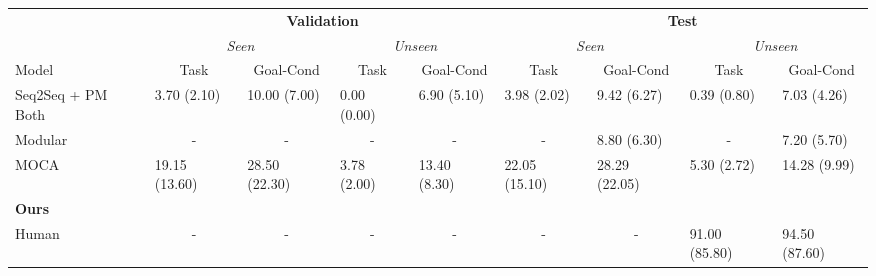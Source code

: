 \documentclass[11pt,a4paper]{article}
\begin{document}
\begin{table}[]
\centering
\resizebox{\textwidth}{!}
{\begin{tabular}{@{}lllllllll@{}}
\toprule
                         & \multicolumn{4}{c}{\textbf{Validation}}                                                                             & \multicolumn{4}{c}{\textbf{Test}}                                                                                   \\
                         & \multicolumn{2}{c}{\textit{Seen}}                        & \multicolumn{2}{c}{\textit{Unseen}}                      & \multicolumn{2}{c}{\textit{Seen}}                        & \multicolumn{2}{c}{\textit{Unseen}}                      \\
Model                    & \multicolumn{1}{c}{Task} & \multicolumn{1}{c}{Goal-Cond} & \multicolumn{1}{c}{Task} & \multicolumn{1}{c}{Goal-Cond} & \multicolumn{1}{c}{Task} & \multicolumn{1}{c}{Goal-Cond} & \multicolumn{1}{c}{Task} & \multicolumn{1}{c}{Goal-Cond} \\ \midrule
Seq2Seq + PM Both \cite{shridhar2020alfred}                & 3.70 (2.10)              & 10.00 (7.00)                  & 0.00 (0.00)              & 6.90 (5.10)                   & 3.98 (2.02)              & 9.42 (6.27)                   & 0.39 (0.80)              & 7.03 (4.26)                   \\
Modular \cite{corona2020modularity}          & \multicolumn{1}{c}{-}    & \multicolumn{1}{c}{-}         & \multicolumn{1}{c}{-}    & \multicolumn{1}{c}{-}         & \multicolumn{1}{c}{-}    & 8.80 (6.30)                   & \multicolumn{1}{c}{-}    & 7.20 (5.70)                   \\
MOCA \cite{singh2020moca}                     & 19.15 (13.60)            & 28.50 (22.30)                 & 3.78 (2.00)              & 13.40 (8.30)                  & 22.05 (15.10)            & 28.29 (22.05)                 & 5.30 (2.72)              & 14.28 (9.99)                  \\
\textbf{Ours}            &                          &                               &                          &                               &                          &                               &                          &                               \\ \midrule
Human                    & \multicolumn{1}{c}{-}    & \multicolumn{1}{c}{-}         & \multicolumn{1}{c}{-}    & \multicolumn{1}{c}{-}         & \multicolumn{1}{c}{-}    & \multicolumn{1}{c}{-}         & 91.00 (85.80)            & 94.50 (87.60)                 \\ \midrule

\end{tabular}}
\end{table}
\end{document}
